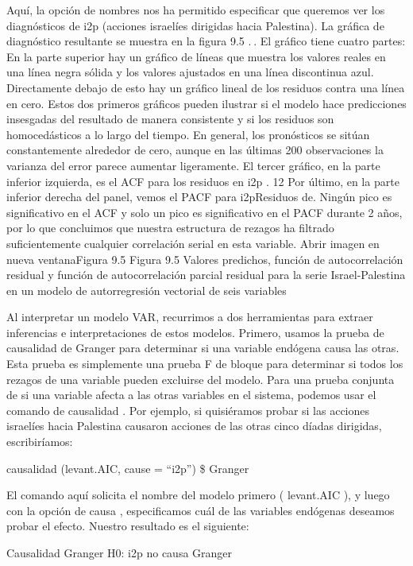 \documentclass[
]{book}
\begin{document}
Aquí, la opción de nombres nos ha permitido especificar que queremos ver los diagnósticos de i2p (acciones israelíes dirigidas hacia Palestina). La gráfica de diagnóstico resultante se muestra en la figura 9.5 . . El gráfico tiene cuatro partes: En la parte superior hay un gráfico de líneas que muestra los valores reales en una línea negra sólida y los valores ajustados en una línea discontinua azul. Directamente debajo de esto hay un gráfico lineal de los residuos contra una línea en cero. Estos dos primeros gráficos pueden ilustrar si el modelo hace predicciones insesgadas del resultado de manera consistente y si los residuos son homocedásticos a lo largo del tiempo. En general, los pronósticos se sitúan constantemente alrededor de cero, aunque en las últimas 200 observaciones la varianza del error parece aumentar ligeramente. El tercer gráfico, en la parte inferior izquierda, es el ACF para los residuos en i2p . 12 Por último, en la parte inferior derecha del panel, vemos el PACF para i2pResiduos de. Ningún pico es significativo en el ACF y solo un pico es significativo en el PACF durante 2 años, por lo que concluimos que nuestra estructura de rezagos ha filtrado suficientemente cualquier correlación serial en esta variable.
Abrir imagen en nueva ventanaFigura 9.5
Figura 9.5
Valores predichos, función de autocorrelación residual y función de autocorrelación parcial residual para la serie Israel-Palestina en un modelo de autorregresión vectorial de seis variables

Al interpretar un modelo VAR, recurrimos a dos herramientas para extraer inferencias e interpretaciones de estos modelos. Primero, usamos la prueba de causalidad de Granger para determinar si una variable endógena causa las otras. Esta prueba es simplemente una prueba F de bloque para determinar si todos los rezagos de una variable pueden excluirse del modelo. Para una prueba conjunta de si una variable afecta a las otras variables en el sistema, podemos usar el comando de causalidad . Por ejemplo, si quisiéramos probar si las acciones israelíes hacia Palestina causaron acciones de las otras cinco díadas dirigidas, escribiríamos:

causalidad (levant.AIC, cause = ``i2p'') \$ Granger

El comando aquí solicita el nombre del modelo primero ( levant.AIC ), y luego con la opción de causa , especificamos cuál de las variables endógenas deseamos probar el efecto. Nuestro resultado es el siguiente:

Causalidad Granger H0: i2p no causa Granger
\end{document}
